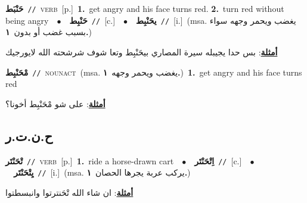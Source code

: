 \documentclass[10pt,a4paper,twoside]{article} %
\begin{document}
\begin{multicols}{2}
{\setlength\topsep{0pt}\textbf{\foreignlanguage{arabic}{حَنْبَط}}\ {\color{gray}\texttt{//}\color{black}}\ \textsc{verb}\ [p.]\ \textbf{1.}~get angry and his face turns red.  \textbf{2.}~turn red without being angry\ \ $\bullet$\ \ \setlength\topsep{0pt}\textbf{\foreignlanguage{arabic}{حَنْبِط}}\ {\color{gray}\texttt{//}\color{black}}\ [c.]\ \ $\bullet$\ \ \setlength\topsep{0pt}\textbf{\foreignlanguage{arabic}{يحَنْبِط}}\ {\color{gray}\texttt{//}\color{black}}\ [i.]\ \color{gray}(msa. \foreignlanguage{arabic}{يغضب ويحمر وجهه سواء بسبب غضب أو بدون}~\foreignlanguage{arabic}{\textbf{١.}})\color{black}\  \begin{flushright}\color{gray}\foreignlanguage{arabic}{\textbf{\underline{\foreignlanguage{arabic}{أمثلة}}}: بس حدا يجيبله سيرة المصاري بيحَنْبِط وتعا شوف شرشحته الله لايورجيك}\end{flushright}\color{black}} \vspace{2mm}

{\setlength\topsep{0pt}\textbf{\foreignlanguage{arabic}{مْحَنْبِط}}\ {\color{gray}\texttt{//}\color{black}}\ \textsc{noun\textunderscore act}\ \color{gray}(msa. \foreignlanguage{arabic}{يغضب ويحمر وجهه}~\foreignlanguage{arabic}{\textbf{١.}})\color{black}\ \textbf{1.}~get angry and his face turns red\  \begin{flushright}\color{gray}\foreignlanguage{arabic}{\textbf{\underline{\foreignlanguage{arabic}{أمثلة}}}: على شو مْحَنْبِط أخونا؟}\end{flushright}\color{black}} \vspace{2mm}

\vspace{-3mm}
\subsection*{\color{blue}\foreignlanguage{arabic}{ح.ن.ت.ر}\color{blue}{}} 

{\setlength\topsep{0pt}\textbf{\foreignlanguage{arabic}{تْحَنْتَر}}\ {\color{gray}\texttt{//}\color{black}}\ \textsc{verb}\ [p.]\ \textbf{1.}~ride a horse-drawn cart\ \ $\bullet$\ \ \setlength\topsep{0pt}\textbf{\foreignlanguage{arabic}{اِتْحَنْتَر}}\ {\color{gray}\texttt{//}\color{black}}\ [c.]\ \ $\bullet$\ \ \setlength\topsep{0pt}\textbf{\foreignlanguage{arabic}{يِتْحَنْتَر}}\ {\color{gray}\texttt{//}\color{black}}\ [i.]\ \color{gray}(msa. \foreignlanguage{arabic}{يركب عربة يجرها الحصان}~\foreignlanguage{arabic}{\textbf{١.}})\color{black}\  \begin{flushright}\color{gray}\foreignlanguage{arabic}{\textbf{\underline{\foreignlanguage{arabic}{أمثلة}}}: ان شاء الله تْحَنترتوا وانبسطتوا}\end{flushright}\color{black}} \vspace{2mm}


\end{multicols}
\end{document}
